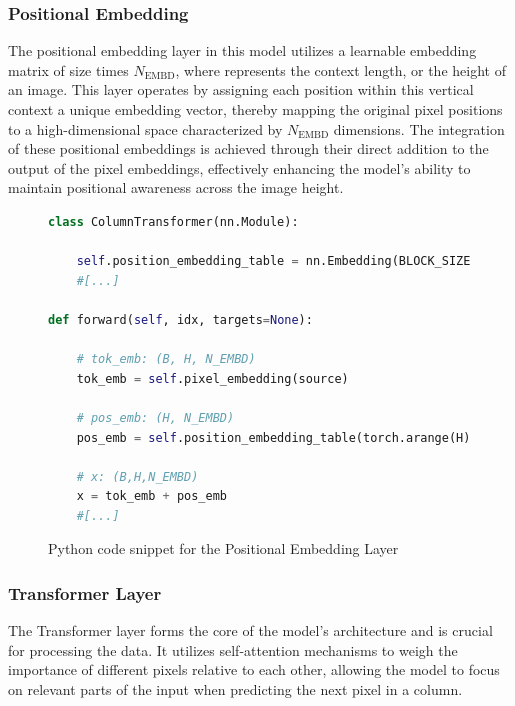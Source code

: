     \subsubsection{Positional Embedding}
    \label{sec:CIT_PositionalEmbedding}

    The positional embedding layer in this model utilizes a learnable embedding matrix of size  times \(N_{\text{EMBD}}\), where  represents the context length, or the height of an image. This layer operates by assigning each position within this vertical context a unique embedding vector, thereby mapping the original pixel positions to a high-dimensional space characterized by \(N_{\text{EMBD}}\) dimensions. The integration of these positional embeddings is achieved through their direct addition to the output of the pixel embeddings, effectively enhancing the model's ability to maintain positional awareness across the image height.


\begin{figure}[H]
    \centering
    \begin{lstlisting}[language=Python]
class ColumnTransformer(nn.Module):

    self.position_embedding_table = nn.Embedding(BLOCK_SIZE, N_EMBD)
    #[...]

def forward(self, idx, targets=None):

    # tok_emb: (B, H, N_EMBD)
    tok_emb = self.pixel_embedding(source) 

    # pos_emb: (H, N_EMBD)
    pos_emb = self.position_embedding_table(torch.arange(H)) 

    # x: (B,H,N_EMBD)
    x = tok_emb + pos_emb 
    #[...]
\end{lstlisting}
\caption{Python code snippet for the Positional Embedding Layer}
\label{fig:posEmbend_CIT}
\end{figure}
   
    \subsubsection{Transformer Layer}

    The Transformer layer forms the core of the model's architecture and is crucial for processing the data. It utilizes self-attention mechanisms \autocite{vaswani2023attention} to weigh the importance of different pixels relative to each other, allowing the model to focus on relevant parts of the input when predicting the next pixel in a column. 

